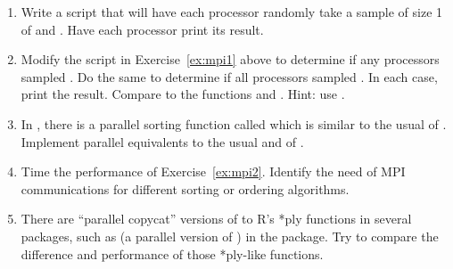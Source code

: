 \begin{enumerate}[label=\thechapter-\arabic*]
\item Write a script that will have each processor randomly take a sample of
      size 1 of  and . Have each processor print its
      result.\label{ex:mpi1}

\item 
Modify the script in Exercise~\ref{ex:mpi1} above to determine if any
processors sampled . Do the same to determine if all processors 
sampled . In each case, print the result. Compare to the functions 
 and . {\color{blue} Hint:  use 
.} 

\item In , there is a parallel sorting function called      
 which is similar to the usual  of 
. Implement parallel equivalents to the usual  
and  of .\label{ex:mpi2}

\item 
Time the performance of Exercise~\ref{ex:mpi2}. Identify the need of MPI 
communications for different sorting or ordering algorithms.

\item 
There are ``parallel copycat'' versions of to R's *ply functions in several 
 packages, such as  (a parallel version of 
) in the  package.
Try to compare the difference and performance of those *ply-like functions.

\end{enumerate}



